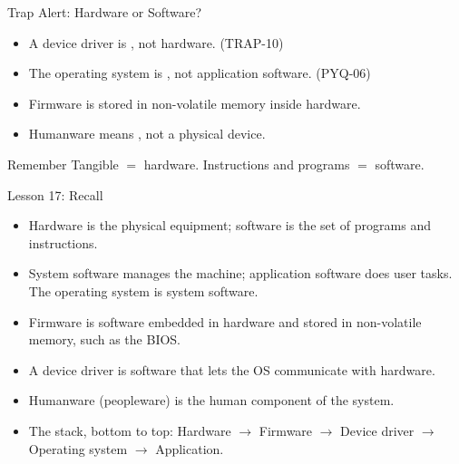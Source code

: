 \documentclass[aspectratio=169]{beamer}
\begin{document}
\begin{frame}{Trap Alert: Hardware or Software?}
  \begin{itemize}
    \item A device driver is , not hardware. (TRAP-10)
    \item The operating system is , not application
      software. (PYQ-06)
    \item Firmware is  stored in non-volatile memory inside
      hardware.
    \item Humanware means , not a physical device.
  \end{itemize}
  \begin{alertblock}{Remember}
    Tangible $=$ hardware. Instructions and programs $=$ software.
  \end{alertblock}
\end{frame}

\begin{frame}{Lesson 17: Recall}
  \begin{itemize}
    \item Hardware is the physical equipment; software is the set of programs
      and instructions.
    \item System software manages the machine; application software does user
      tasks. The operating system is system software.
    \item Firmware is software embedded in hardware and stored in
      non-volatile memory, such as the BIOS.
    \item A device driver is software that lets the OS communicate with
      hardware.
    \item Humanware (peopleware) is the human component of the system.
    \item The stack, bottom to top: Hardware $\rightarrow$ Firmware $\rightarrow$
      Device driver $\rightarrow$ Operating system $\rightarrow$ Application.
  \end{itemize}
\end{frame}
\end{document}
